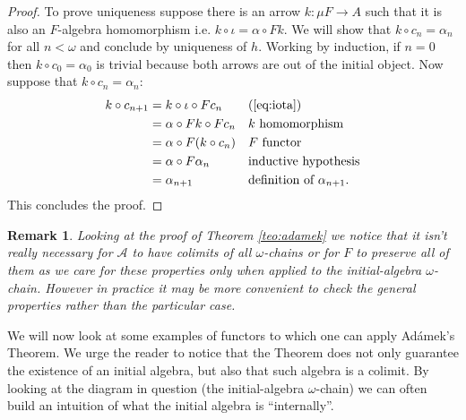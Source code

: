 \documentclass[letterpaper, 11pt, oneside]{memoir}
\theoremstyle{myteo}
\newtheorem{remark}[theorem]{Remark}
\numberwithin{equation}{section}
\newcommand{\A}{\mathscr{A}}
\begin{document}
\begin{proof}
  To prove uniqueness suppose there is an arrow \(k \colon \mu F \to A\) such that it is also an \(F\)-algebra homomorphism i.e. \(k \circ \iota = \alpha \circ Fk\).
  We will show that \(k \circ c_n = \alpha_n\) for all \(n < \omega\) and conclude by uniqueness of \(h\).
  Working by induction, if \(n = 0\) then \(k \circ c_0 = \alpha_0\) is trivial because both arrows are out of the initial object.
  Now suppose that \(k \circ c_n = \alpha_n\):
  \begin{align*}
    k \circ c_{n+1} &= k \circ \iota \circ Fc_n && \text{(\ref{eq:iota})}\\
    &= \alpha \circ Fk \circ Fc_n && \text{\(k\) homomorphism}\\
    &= \alpha \circ F(k \circ c_n) && \text{\(F\) functor}\\
    &= \alpha \circ F\alpha_n && \text{inductive hypothesis}\\
    &= \alpha_{n+1} && \text{definition of \(\alpha_{n+1}\)}.\\
  \end{align*}
  This concludes the proof.
\end{proof}

\begin{remark}
  Looking at the proof of Theorem \ref{teo:adamek} we notice that it isn't really necessary for \(\A\) to have colimits of \emph{all} \(\omega\)-chains or for \(F\) to preserve \emph{all} of them as we care for these properties only when applied to the initial-algebra \(\omega\)-chain.
  However in practice it may be more convenient to check the general properties rather than the particular case.
\end{remark}

We will now look at some examples of functors to which one can apply Adámek's Theorem.
We urge the reader to notice that the Theorem does not only guarantee the existence of an initial algebra, but also that such algebra is a colimit.
By looking at the diagram in question (the initial-algebra \(\omega\)-chain) we can often build an intuition of what the initial algebra is ``internally''.
\end{document}
